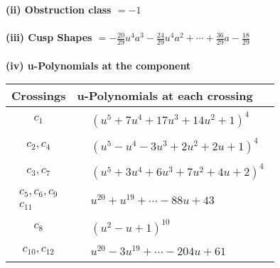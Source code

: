\documentclass[1p]{elsarticle_modified}
\theoremstyle{definition}
\begin{document}
\flushleft \textbf{(ii) Obstruction class $= -1$}\\~\\
\flushleft \textbf{(iii) Cusp Shapes $= -\frac{20}{29} u^4 a^3-\frac{24}{29} u^4 a^2+\cdots+\frac{36}{29} a-\frac{18}{29}$}\\~\\
\newpage\renewcommand{\arraystretch}{1}
\flushleft \textbf{(iv) u-Polynomials at the component}\newline \\
\begin{tabular}{m{50pt}|m{274pt}}
Crossings & \hspace{64pt}u-Polynomials at each crossing \\
\hline $$\begin{aligned}c_{1}\end{aligned}$$&$\begin{aligned}
&(u^5+7 u^4+17 u^3+14 u^2+1)^4
\end{aligned}$\\
\hline $$\begin{aligned}c_{2},c_{4}\end{aligned}$$&$\begin{aligned}
&(u^5- u^4-3 u^3+2 u^2+2 u+1)^4
\end{aligned}$\\
\hline $$\begin{aligned}c_{3},c_{7}\end{aligned}$$&$\begin{aligned}
&(u^5+3 u^4+6 u^3+7 u^2+4 u+2)^4
\end{aligned}$\\
\hline $$\begin{aligned}c_{5},c_{6},c_{9}\\c_{11}\end{aligned}$$&$\begin{aligned}
&u^{20}+u^{19}+\cdots-88 u+43
\end{aligned}$\\
\hline $$\begin{aligned}c_{8}\end{aligned}$$&$\begin{aligned}
&(u^2- u+1)^{10}
\end{aligned}$\\
\hline $$\begin{aligned}c_{10},c_{12}\end{aligned}$$&$\begin{aligned}
&u^{20}-3 u^{19}+\cdots-204 u+61
\end{aligned}$\\
\hline
\end{tabular}\\~\\
\end{document}
